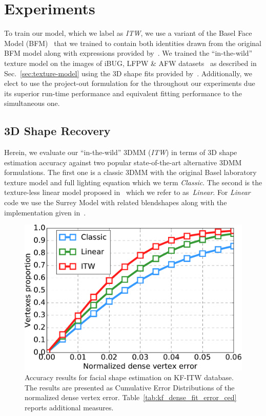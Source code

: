 %
\section{Experiments}
\label{sec:experiments}


To train our model, which we label as \textit{ITW}, we use a variant of the Basel Face Model (BFM)~\cite{paysan20093d} that we trained to contain both identities drawn from the original BFM model along with expressions provided by~\cite{cao2014facewarehouse}. 
We trained the ``in-the-wild'' texture model on the images of iBUG, LFPW \& AFW datasets~\cite{sagonas2016faces} as described in Sec.~\ref{sec:texture-model} using the 3D shape fits provided by~\cite{Zhu_2016_CVPR}. Additionally, we elect to use the project-out formulation for the throughout our experiments due its superior run-time performance and equivalent fitting performance to the simultaneous one.


\subsection{3D Shape Recovery}
\label{sec:experiments-quantitative-shape}
Herein, we evaluate our ``in-the-wild'' 3DMM (\textit{ITW}) in terms of 3D shape estimation accuracy against two popular state-of-the-art alternative 3DMM formulations. The first one is a classic 3DMM with the original Basel laboratory texture model and full lighting equation which we term
\textit{Classic}. The second is the texture-less linear model proposed in~\cite{huber2015fitting,huber2016multiresolution} which we refer to as~\textit{Linear}. For \textit{Linear} code we use the Surrey Model with related blendshapes along with the implementation given in~\cite{huber2016multiresolution}. 

\begin{figure}[!t]
    \centering
    \includegraphics[width=\linewidth]{exp_3dmm}
    \caption{Accuracy results for facial shape estimation on KF-ITW database. The 
    results are presented as Cumulative Error Distributions of the normalized dense vertex error. Table~\ref{tab:kf_dense_fit_error_ced} reports additional measures.}
    \label{fig:kf_dense_fit_error_ced}
\end{figure}

